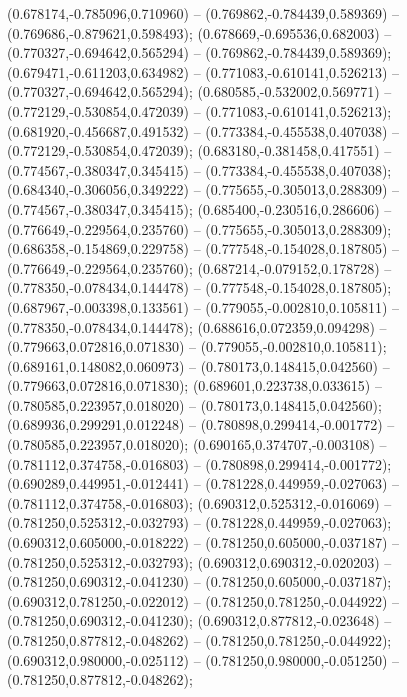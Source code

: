  (0.678174,-0.785096,0.710960) -- (0.769862,-0.784439,0.589369) -- (0.769686,-0.879621,0.598493);
 (0.678669,-0.695536,0.682003) -- (0.770327,-0.694642,0.565294) -- (0.769862,-0.784439,0.589369);
 (0.679471,-0.611203,0.634982) -- (0.771083,-0.610141,0.526213) -- (0.770327,-0.694642,0.565294);
 (0.680585,-0.532002,0.569771) -- (0.772129,-0.530854,0.472039) -- (0.771083,-0.610141,0.526213);
 (0.681920,-0.456687,0.491532) -- (0.773384,-0.455538,0.407038) -- (0.772129,-0.530854,0.472039);
 (0.683180,-0.381458,0.417551) -- (0.774567,-0.380347,0.345415) -- (0.773384,-0.455538,0.407038);
 (0.684340,-0.306056,0.349222) -- (0.775655,-0.305013,0.288309) -- (0.774567,-0.380347,0.345415);
 (0.685400,-0.230516,0.286606) -- (0.776649,-0.229564,0.235760) -- (0.775655,-0.305013,0.288309);
 (0.686358,-0.154869,0.229758) -- (0.777548,-0.154028,0.187805) -- (0.776649,-0.229564,0.235760);
 (0.687214,-0.079152,0.178728) -- (0.778350,-0.078434,0.144478) -- (0.777548,-0.154028,0.187805);
 (0.687967,-0.003398,0.133561) -- (0.779055,-0.002810,0.105811) -- (0.778350,-0.078434,0.144478);
 (0.688616,0.072359,0.094298) -- (0.779663,0.072816,0.071830) -- (0.779055,-0.002810,0.105811);
 (0.689161,0.148082,0.060973) -- (0.780173,0.148415,0.042560) -- (0.779663,0.072816,0.071830);
 (0.689601,0.223738,0.033615) -- (0.780585,0.223957,0.018020) -- (0.780173,0.148415,0.042560);
 (0.689936,0.299291,0.012248) -- (0.780898,0.299414,-0.001772) -- (0.780585,0.223957,0.018020);
 (0.690165,0.374707,-0.003108) -- (0.781112,0.374758,-0.016803) -- (0.780898,0.299414,-0.001772);
 (0.690289,0.449951,-0.012441) -- (0.781228,0.449959,-0.027063) -- (0.781112,0.374758,-0.016803);
 (0.690312,0.525312,-0.016069) -- (0.781250,0.525312,-0.032793) -- (0.781228,0.449959,-0.027063);
 (0.690312,0.605000,-0.018222) -- (0.781250,0.605000,-0.037187) -- (0.781250,0.525312,-0.032793);
 (0.690312,0.690312,-0.020203) -- (0.781250,0.690312,-0.041230) -- (0.781250,0.605000,-0.037187);
 (0.690312,0.781250,-0.022012) -- (0.781250,0.781250,-0.044922) -- (0.781250,0.690312,-0.041230);
 (0.690312,0.877812,-0.023648) -- (0.781250,0.877812,-0.048262) -- (0.781250,0.781250,-0.044922);
 (0.690312,0.980000,-0.025112) -- (0.781250,0.980000,-0.051250) -- (0.781250,0.877812,-0.048262);
